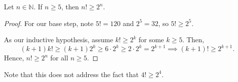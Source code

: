 \begin{claim}
Let $ n\in\mathbb{N} $. If $ n\geq 5 $, then $ n!\geq 2^n $.
\end{claim}
\begin{proof}
For our base step, note $ 5!=120 $ and $ 2^5=32 $, so $ 5!\geq 2^5 $.

As our inductive hypothesis, assume $ k!\geq 2^k $ for some $ k\geq 5 $. Then,
\begin{equation*}
    (k+1)k!\geq (k+1)2^k \geq 6\cdot 2^k \geq 2\cdot 2^k=2^{k+1} \implies (k+1)!\geq 2^{k+1}.
\end{equation*}
Hence, $ n!\geq 2^n $ for all $ n\geq 5 $.
\end{proof}

Note that this does not address the fact that $ 4!\geq 2^4$.


